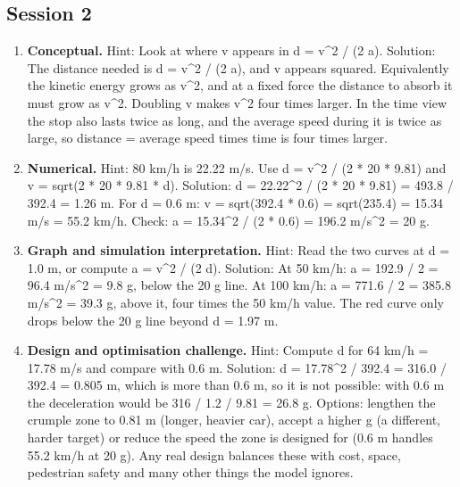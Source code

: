 \documentclass[11pt,a4paper]{article}
\begin{document}
\subsection*{Session 2}
\begin{enumerate}[nosep]
\item \textbf{Conceptual.} Hint: Look at where v appears in d = v\textasciicircum{}2 / (2 a). Solution: The distance needed is d = v\textasciicircum{}2 / (2 a), and v appears squared. Equivalently the kinetic energy grows as v\textasciicircum{}2, and at a fixed force the distance to absorb it must grow as v\textasciicircum{}2. Doubling v makes v\textasciicircum{}2 four times larger. In the time view the stop also lasts twice as long, and the average speed during it is twice as large, so distance = average speed times time is four times larger.
\item \textbf{Numerical.} Hint: 80 km/h is 22.22 m/s. Use d = v\textasciicircum{}2 / (2 * 20 * 9.81) and v = sqrt(2 * 20 * 9.81 * d). Solution: d = 22.22\textasciicircum{}2 / (2 * 20 * 9.81) = 493.8 / 392.4 = 1.26 m. For d = 0.6 m: v = sqrt(392.4 * 0.6) = sqrt(235.4) = 15.34 m/s = 55.2 km/h. Check: a = 15.34\textasciicircum{}2 / (2 * 0.6) = 196.2 m/s\textasciicircum{}2 = 20 g.
\item \textbf{Graph and simulation interpretation.} Hint: Read the two curves at d = 1.0 m, or compute a = v\textasciicircum{}2 / (2 d). Solution: At 50 km/h: a = 192.9 / 2 = 96.4 m/s\textasciicircum{}2 = 9.8 g, below the 20 g line. At 100 km/h: a = 771.6 / 2 = 385.8 m/s\textasciicircum{}2 = 39.3 g, above it, four times the 50 km/h value. The red curve only drops below the 20 g line beyond d = 1.97 m.
\item \textbf{Design and optimisation challenge.} Hint: Compute d for 64 km/h = 17.78 m/s and compare with 0.6 m. Solution: d = 17.78\textasciicircum{}2 / 392.4 = 316.0 / 392.4 = 0.805 m, which is more than 0.6 m, so it is not possible: with 0.6 m the deceleration would be 316 / 1.2 / 9.81 = 26.8 g. Options: lengthen the crumple zone to 0.81 m (longer, heavier car), accept a higher g (a different, harder target) or reduce the speed the zone is designed for (0.6 m handles 55.2 km/h at 20 g). Any real design balances these with cost, space, pedestrian safety and many other things the model ignores.
\end{enumerate}
\end{document}
